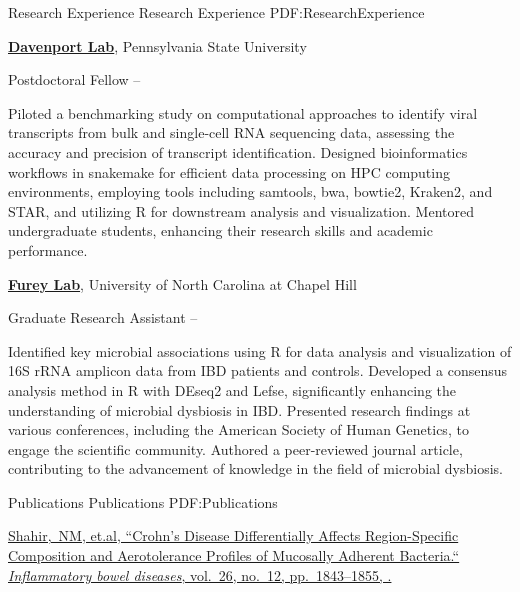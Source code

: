 \documentclass[letterpaper,MMMyyyy,nonstopmode]{simpleresumecv}
\begin{document}
\begin{Body}

\Section
{Research Experience}
{Research Experience}
{PDF:ResearchExperience}

\Entry
\href{https://davenport-lab.github.io/}
{\textbf{Davenport Lab}},
Pennsylvania State University

\Gap
\BulletItem
Postdoctoral Fellow
\hfill
{} --
\begin{Detail}
\SubBulletItem
Piloted a benchmarking study on computational approaches to identify viral transcripts from bulk and single-cell RNA sequencing data, assessing the accuracy and precision of transcript identification.
\SubBulletItem
Designed bioinformatics workflows in snakemake for efficient data processing on HPC computing environments, employing tools including samtools, bwa, bowtie2, Kraken2, and STAR, and utilizing R for downstream analysis and visualization.
\SubBulletItem
Mentored undergraduate students, enhancing their research skills and academic performance.
\end{Detail}

\BigGap
\Entry
\href{https://fureylab.web.unc.edu/}
{\textbf{Furey Lab}},
University of North Carolina at Chapel Hill

\Gap
\BulletItem
Graduate Research Assistant
\hfill
{} --
\begin{Detail}
\SubBulletItem
Identified key microbial associations using R for data analysis and visualization of 16S rRNA amplicon data from IBD patients and controls.
\SubBulletItem
Developed a consensus analysis method in R with DEseq2 and Lefse, significantly enhancing the understanding of microbial dysbiosis in IBD.
\SubBulletItem
Presented research findings at various conferences, including the American Society of Human Genetics, to engage the scientific community.
\SubBulletItem
Authored a peer-reviewed journal article, contributing to the advancement of knowledge in the field of microbial dysbiosis.
\end{Detail}

\Section
{Publications}
{Publications}
{PDF:Publications}

\Entry
\href{https://pubmed.ncbi.nlm.nih.gov/32469069/}
{\underline{Shahir,~NM}, et.al,
``Crohn's Disease Differentially Affects Region-Specific Composition and Aerotolerance Profiles of Mucosally Adherent Bacteria.``
\textit{ Inflammatory bowel diseases},
vol.~26,
no.~12,
pp.~1843--1855,
.}


\end{Body}
\end{document}
